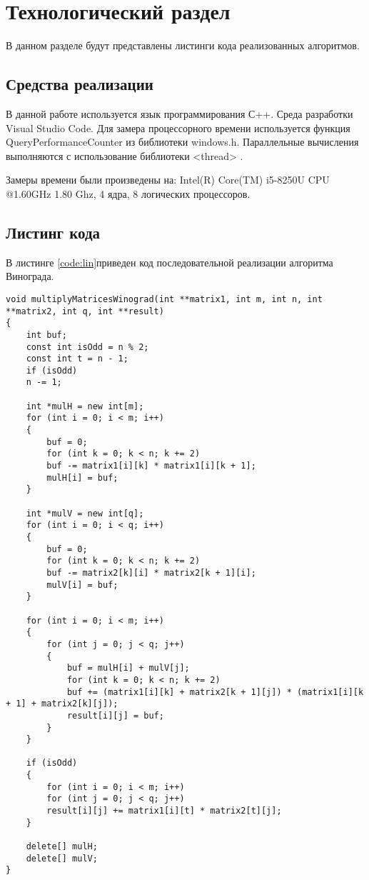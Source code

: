 \chapter{Технологический раздел}
\label{cha:impl}
В данном разделе будут представлены листинги кода реализованных алгоритмов.
\section{Средства реализации}
В данной работе используется язык программирования С++. Среда разработки Visual Studio Code. Для замера процессорного времени используется функция QueryPerformanceCounter из библиотеки windows.h. Параллельные вычисления выполняются с использование библиотеки <thread> \cite{Threads}.
\par Замеры времени были произведены на: Intel(R) Core(TM) i5-8250U CPU @1.60GHz 1.80 Ghz, 4 ядра, 8 логических процессоров.

\section{Листинг кода}
В листинге \ref{code:lin}приведен код последовательной реализации алгоритма Винограда.
\begin{lstlisting}[caption= Алгоритм Винограда, label=code:lin]
void multiplyMatricesWinograd(int **matrix1, int m, int n, int **matrix2, int q, int **result)
{
	int buf;
	const int isOdd = n % 2;
	const int t = n - 1;
	if (isOdd)
	n -= 1;
	
	int *mulH = new int[m];
	for (int i = 0; i < m; i++)
	{
		buf = 0;
		for (int k = 0; k < n; k += 2)
		buf -= matrix1[i][k] * matrix1[i][k + 1];
		mulH[i] = buf;
	}
	
	int *mulV = new int[q];
	for (int i = 0; i < q; i++)
	{
		buf = 0;
		for (int k = 0; k < n; k += 2)
		buf -= matrix2[k][i] * matrix2[k + 1][i];
		mulV[i] = buf;
	}
	
	for (int i = 0; i < m; i++)
	{
		for (int j = 0; j < q; j++)
		{
			buf = mulH[i] + mulV[j];
			for (int k = 0; k < n; k += 2)
			buf += (matrix1[i][k] + matrix2[k + 1][j]) * (matrix1[i][k + 1] + matrix2[k][j]);
			result[i][j] = buf;
		}
	}
	
	if (isOdd)
	{
		for (int i = 0; i < m; i++)
		for (int j = 0; j < q; j++)
		result[i][j] += matrix1[i][t] * matrix2[t][j];
	}
	
	delete[] mulH;
	delete[] mulV;
}
\end{lstlisting}

